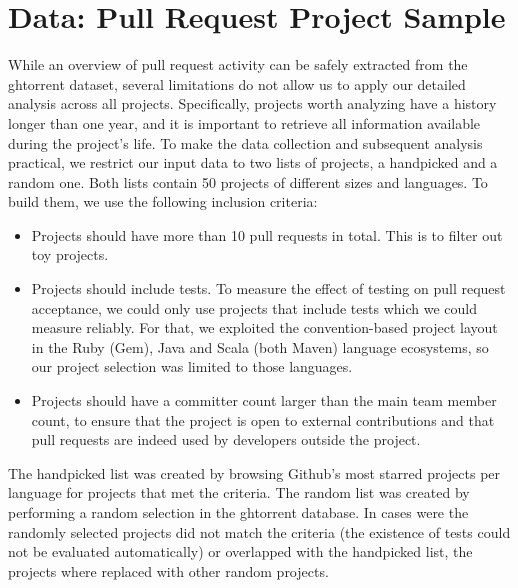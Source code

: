 \documentclass{sig-alternate}
\begin{document}


\section{Data: Pull Request Project Sample}
\label{sec:expdata} 

While an overview of pull request activity can be safely extracted from the {\sc
ght}orrent dataset, several limitations do not allow us to apply our detailed
analysis across all projects. Specifically, projects worth analyzing have a
history longer than one year, and it is important to retrieve all information
available during the project's life. To make the data collection and subsequent
analysis practical, we restrict our input data to two lists of projects, a
\textsf{handpicked} and a \textsf{random} one. Both lists contain 50 projects
of different sizes and languages. To build them, we use the following
inclusion criteria:

\begin{itemize}

  \item Projects should have more than 10 pull requests in total. This is
    to filter out toy projects. 

  \item Projects should include tests. To measure the effect of testing on pull
    request acceptance, we could only use projects that include tests which we
    could measure reliably. For that, we exploited the convention-based project
    layout in the Ruby (Gem), Java and Scala (both Maven) language ecosystems,
    so our project selection was limited to those languages. 

  \item Projects should have a committer count larger than the main team member
    count, to ensure that the project is open to external contributions and that
    pull requests are indeed used by developers outside the project.

\end{itemize}

The \textsf{handpicked} list was created by browsing Github's most starred projects
per language for projects that met the criteria. The \textsf{random} list
was created by performing a random selection in the {\sc ght}orrent database. In
cases were the randomly selected projects did not match the criteria (the existence
of tests could not be evaluated automatically) or overlapped with the
\textsf{handpicked} list, the projects where replaced with
other random projects. 
\end{document}
